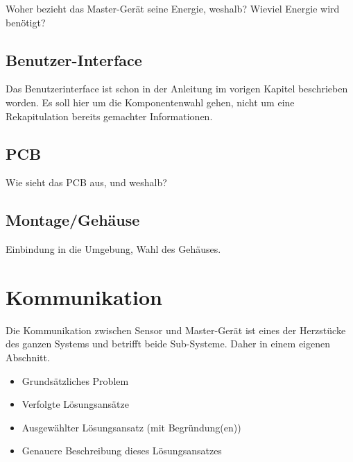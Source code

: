 Woher bezieht das Master-Ger\"at  seine Energie, weshalb? Wieviel Energie wird
ben\"otigt?


\subsection{Benutzer-Interface}
\label{subsec:mastergerat:interface}

\anweisung Das Benutzerinterface ist schon in der Anleitung im vorigen Kapitel
beschrieben worden. Es soll  hier um die Komponentenwahl gehen,  nicht um eine
Rekapitulation bereits gemachter Informationen.

\subsection{PCB}
\label{subsec:mastergerat:pcb}

Wie sieht das PCB aus, und weshalb?

\subsection{Montage/Geh\"ause}
\label{subsec:mastergerat:pcb}

Einbindung in die Umgebung, Wahl des Geh\"auses.


\section{Kommunikation}
\label{sec:kommunikation}

Die   Kommunikation  zwischen   Sensor  und   Master-Ger\"at  ist   eines  der
Herzst\"ucke des ganzen Systems und betrifft beide Sub-Systeme. Daher in einem
eigenen Abschnitt.

\begin{itemize}
    \item
        Grunds\"atzliches Problem
    \item
        Verfolgte L\"osungsans\"atze
    \item
        Ausgew\"ahlter L\"osungsansatz (mit Begr\"undung(en))
    \item
        Genauere Beschreibung dieses L\"osungsansatzes
\end{itemize}

